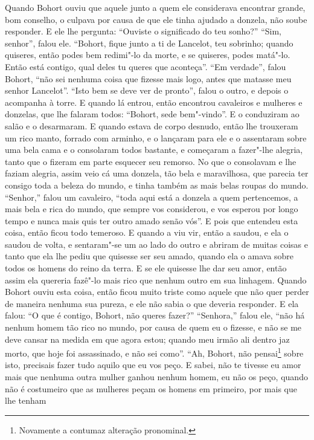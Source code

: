Quando Bohort ouviu que aquele junto a quem ele considerava encontrar grande,
bom conselho, o culpava por causa de que ele tinha ajudado a donzela, não soube
responder. E ele lhe pergunta: “Ouviste o significado do teu sonho?” “Sim,
senhor”, falou ele. “Bohort, fique junto a ti de Lancelot, teu sobrinho;
quando quiseres, então podes bem redimi"-lo da morte, e se quiseres, podes
matá"-lo. Então está contigo, qual deles tu queres que aconteça”. “Em
verdade”, falou Bohort, “não sei nenhuma coisa que fizesse mais logo, antes que
matasse meu senhor Lancelot”. “Isto bem se deve ver de pronto”, falou o outro,
e depois o acompanha à torre. E quando lá entrou, então encontrou cavaleiros e
mulheres e donzelas, que lhe falaram todos: “Bohort, sede bem"-vindo”. E o
conduziram ao salão e o desarmaram. E quando estava de corpo desnudo, então lhe
trouxeram um rico manto, forrado com arminho, e o lançaram para ele e o
assentaram sobre uma bela cama e o consolaram todos bastante, e começaram a
fazer"-lhe alegria, tanto que o fizeram em parte esquecer seu remorso. No que o
consolavam e lhe faziam alegria, assim veio cá uma donzela, tão bela e
maravilhosa, que parecia ter consigo toda a beleza do mundo, e tinha também as
mais belas roupas do mundo. “Senhor,” falou um cavaleiro, “toda aqui está a
donzela a quem pertencemos, a mais bela e rica do mundo, que sempre vos
considerou, e vos esperou por longo tempo e nunca mais quis ter outro amado
senão vós”. E pois que entendeu esta coisa, então ficou todo temeroso. E quando
a viu vir, então a saudou, e ela o saudou de volta, e sentaram"-se um ao lado do
outro e abriram de muitas coisas e tanto que ela lhe pediu que quisesse ser seu
amado, quando ela o amava sobre todos os homens do reino da terra. E se ele
quisesse lhe dar seu amor, então assim ela quereria fazê"-lo mais rico que
nenhum outro em sua linhagem. Quando Bohort ouviu esta coisa, então
ficou muito triste como aquele que não quer perder de maneira nenhuma
sua pureza, e ele não sabia o que deveria responder. E ela falou: “O
que é contigo, Bohort, não queres fazer?” “Senhora,” falou ele, “não há nenhum
homem tão rico no mundo, por causa de quem eu o fizesse, e não se me deve
cansar na medida em que agora estou; quando meu irmão ali dentro jaz morto, que
hoje foi assassinado, e não sei como”. “Ah, Bohort, não pensai\footnote{
Novamente a contumaz alteração pronominal. } sobre isto, precisais
fazer tudo aquilo que eu vos peço. E sabei, não te tivesse eu amor mais que
nenhuma outra mulher ganhou nenhum homem, eu não os peço, quando não é
costumeiro que as mulheres peçam os homens em primeiro, por mais que lhe tenham
